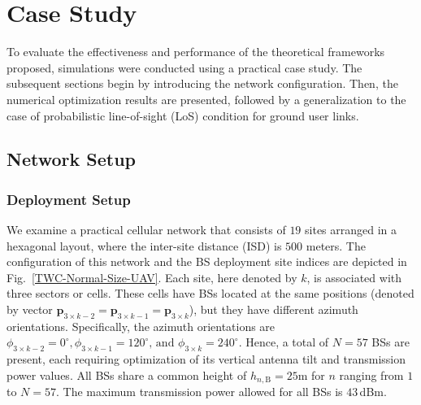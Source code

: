 \section{Case Study}\label{case-study}


To evaluate the effectiveness and performance of the theoretical frameworks proposed, simulations were conducted using a practical case study. The subsequent sections begin by introducing the network configuration. Then, the numerical optimization results are presented, followed by a generalization to the case of probabilistic line-of-sight (LoS) condition for ground user links.



\subsection{Network Setup}\label{experimental-setup}

\subsubsection{Deployment Setup}\label{Deployment-Setup}
We examine a practical cellular network that consists of $19$ sites arranged in a hexagonal layout, where the inter-site distance (ISD) is $500$ meters. The configuration of this network and the BS deployment site indices are depicted in Fig.~\ref{TWC-Normal-Size-UAV}. Each site, here denoted by $k$, is associated with three sectors or cells. These cells have BSs located at the same positions (denoted by vector $\bm{p}_{3\times k-2} = \bm{p}_{3\times k-1} = \bm{p}_{3\times k}$), but they have different azimuth orientations. Specifically, the azimuth orientations are $\phi_{3\times k-2} = 0^\circ, \phi_{3\times k-1} = 120^\circ\textrm{, and } \phi_{3\times k} = 240^\circ$. Hence, a total of $N=57$ BSs are present, each requiring optimization of its vertical antenna tilt and transmission power values. All BSs share a common height of $h_{n,\mathrm{B}} = 25$m for $n$ ranging from $1$ to $N=57$. The maximum transmission power allowed for all BSs is $43$\,dBm.



